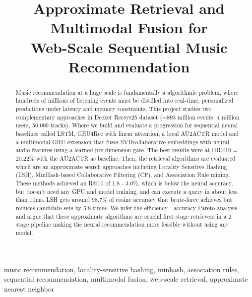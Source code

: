 \documentclass[conference]{IEEEtran}
\begin{document}
\title{Approximate Retrieval and Multimodal Fusion for\\
Web-Scale Sequential Music Recommendation}

\author{
}

\maketitle

\begin{abstract}
Music recommendation at a huge scale is fundamentally a algorithmic problem,
where hundreds of millions of listening events must be distilled into real-time,
personalized predictions under latency and memory constraints. This project
studies two complementary approaches in Deexer Recsys25 dataset (${\sim}893$
million events, 4 million users, 50,000 tracks). Where we build and evaluate
a progression for sequential neural baselines called LSTM, GRU4Rec with linear
attention, a local AU2ACTR model and a multimodal GRU extension that fuses
SVDcollaborative embeddings with neural audio features using a learned
pre-dimension gate. The best results were at HR@10 = 20.22\% with the AU2ACTR
as baseline. Then, the retrieval algorithms are evaluated which are an
approximate search approaches including Locality Sensitive Hashing (LSH),
MinHash-based Collaborative Filtering (CF), and Association Rule mining. These
methods achieved an R@10 of 1.8 - 3.0\%, which is below the neural accuracy,
but doesn't need any GPU and model training, and can execute a query in about
less than 10ms. LSH gets around 98.7\% of cosine accuracy that brute-force
achieves but reduces candidate sets by 5.8 times. We infer the efficiency -
accuracy Pareto analysis and argue that these approximate algorithms are crucial
first stage retrievers in a 2 stage pipeline making the neural recommendation
more feasible without using any model.
\end{abstract}

\begin{IEEEkeywords}
music recommendation, locality-sensitive hashing, minhash, association rules,
sequential recommendation, multimodal fusion, web-scale retrieval,
approximate nearest neighbor
\end{IEEEkeywords}
\end{document}
